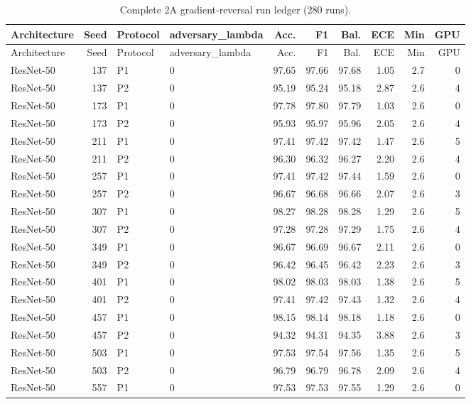 {\scriptsize
\setlength{\tabcolsep}{3.5pt}
\begin{longtable}{lrllrrrrrr}
\caption{Complete 2A gradient-reversal run ledger (280 runs).}\label{r:tab:ledger-grl}\\
\toprule
Architecture & Seed & Protocol & adversary\_lambda & Acc. & F1 & Bal. & ECE & Min & GPU \\
\midrule
\endfirsthead
\toprule
Architecture & Seed & Protocol & adversary\_lambda & Acc. & F1 & Bal. & ECE & Min & GPU \\
\midrule
\endhead
\bottomrule
\endfoot
ResNet-50 & 137 & P1 & 0 & 97.65 & 97.66 & 97.68 & 1.05 & 2.7 & 0 \\
ResNet-50 & 137 & P2 & 0 & 95.19 & 95.24 & 95.18 & 2.87 & 2.6 & 4 \\
ResNet-50 & 173 & P1 & 0 & 97.78 & 97.80 & 97.79 & 1.03 & 2.6 & 0 \\
ResNet-50 & 173 & P2 & 0 & 95.93 & 95.97 & 95.96 & 2.05 & 2.6 & 4 \\
ResNet-50 & 211 & P1 & 0 & 97.41 & 97.42 & 97.42 & 1.47 & 2.6 & 5 \\
ResNet-50 & 211 & P2 & 0 & 96.30 & 96.32 & 96.27 & 2.20 & 2.6 & 4 \\
ResNet-50 & 257 & P1 & 0 & 97.41 & 97.42 & 97.44 & 1.59 & 2.6 & 0 \\
ResNet-50 & 257 & P2 & 0 & 96.67 & 96.68 & 96.66 & 2.07 & 2.6 & 3 \\
ResNet-50 & 307 & P1 & 0 & 98.27 & 98.28 & 98.28 & 1.29 & 2.6 & 5 \\
ResNet-50 & 307 & P2 & 0 & 97.28 & 97.28 & 97.29 & 1.75 & 2.6 & 4 \\
ResNet-50 & 349 & P1 & 0 & 96.67 & 96.69 & 96.67 & 2.11 & 2.6 & 0 \\
ResNet-50 & 349 & P2 & 0 & 96.42 & 96.45 & 96.42 & 2.23 & 2.6 & 3 \\
ResNet-50 & 401 & P1 & 0 & 98.02 & 98.03 & 98.03 & 1.38 & 2.6 & 5 \\
ResNet-50 & 401 & P2 & 0 & 97.41 & 97.42 & 97.43 & 1.32 & 2.6 & 4 \\
ResNet-50 & 457 & P1 & 0 & 98.15 & 98.14 & 98.18 & 1.18 & 2.6 & 0 \\
ResNet-50 & 457 & P2 & 0 & 94.32 & 94.31 & 94.35 & 3.88 & 2.6 & 3 \\
ResNet-50 & 503 & P1 & 0 & 97.53 & 97.54 & 97.56 & 1.35 & 2.6 & 5 \\
ResNet-50 & 503 & P2 & 0 & 96.79 & 96.79 & 96.78 & 2.09 & 2.6 & 4 \\
ResNet-50 & 557 & P1 & 0 & 97.53 & 97.53 & 97.55 & 1.29 & 2.6 & 0 \\

\end{longtable}}
